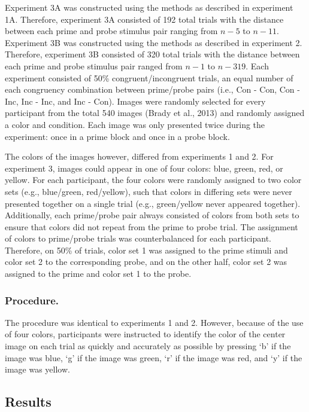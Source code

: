 \documentclass[]{DissertateCUNY}
\begin{document}
Experiment 3A was constructed using the methods as described in
experiment 1A. Therefore, experiment 3A consisted of 192 total trials
with the distance between each prime and probe stimulus pair ranging
from \(n-5\) to \(n-11\). Experiment 3B was constructed using the
methods as described in experiment 2. Therefore, experiment 3B consisted
of 320 total trials with the distance between each prime and probe
stimulus pair ranged from \(n-1\) to \(n-319\). Each experiment
consisted of 50\% congruent/incongruent trials, an equal number of each
congruency combination between prime/probe pairs (i.e., Con - Con, Con -
Inc, Inc - Inc, and Inc - Con). Images were randomly selected for every
participant from the total 540 images (Brady et al., 2013) and randomly
assigned a color and condition. Each image was only presented twice
during the experiment: once in a prime block and once in a probe block.

The colors of the images however, differed from experiments 1 and 2. For
experiment 3, images could appear in one of four colors: blue, green,
red, or yellow. For each participant, the four colors were randomly
assigned to two color sets (e.g., blue/green, red/yellow), such that
colors in differing sets were never presented together on a single trial
(e.g., green/yellow never appeared together). Additionally, each
prime/probe pair always consisted of colors from both sets to ensure
that colors did not repeat from the prime to probe trial. The assignment
of colors to prime/probe trials was counterbalanced for each
participant. Therefore, on 50\% of trials, color set 1 was assigned to
the prime stimuli and color set 2 to the corresponding probe, and on the
other half, color set 2 was assigned to the prime and color set 1 to the
probe.

\hypertarget{procedure.-2}{%
\subsubsection{Procedure.}\label{procedure.-2}}

The procedure was identical to experiments 1 and 2. However, because of
the use of four colors, participants were instructed to identify the
color of the center image on each trial as quickly and accurately as
possible by pressing `b' if the image was blue, `g' if the image was
green, `r' if the image was red, and `y' if the image was yellow.

\hypertarget{results-6}{%
\subsection{Results}\label{results-6}}
\end{document}
